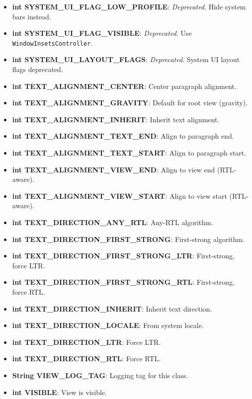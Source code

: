 \documentclass{report}
\begin{document}
\begin{itemize}
\begin{itemize}
                \item \textbf{int SYSTEM\_UI\_FLAG\_LOW\_PROFILE}: \textit{Deprecated}. Hide system bars instead.
                \item \textbf{int SYSTEM\_UI\_FLAG\_VISIBLE}: \textit{Deprecated}. Use \texttt{WindowInsetsController}.
                \item \textbf{int SYSTEM\_UI\_LAYOUT\_FLAGS}: \textit{Deprecated}. System UI layout flags deprecated.
                \item \textbf{int TEXT\_ALIGNMENT\_CENTER}: Center paragraph alignment.
                \item \textbf{int TEXT\_ALIGNMENT\_GRAVITY}: Default for root view (gravity).
                \item \textbf{int TEXT\_ALIGNMENT\_INHERIT}: Inherit text alignment.
                \item \textbf{int TEXT\_ALIGNMENT\_TEXT\_END}: Align to paragraph end.
                \item \textbf{int TEXT\_ALIGNMENT\_TEXT\_START}: Align to paragraph start.
                \item \textbf{int TEXT\_ALIGNMENT\_VIEW\_END}: Align to view end (RTL-aware).
                \item \textbf{int TEXT\_ALIGNMENT\_VIEW\_START}: Align to view start (RTL-aware).
                \item \textbf{int TEXT\_DIRECTION\_ANY\_RTL}: Any-RTL algorithm.
                \item \textbf{int TEXT\_DIRECTION\_FIRST\_STRONG}: First-strong algorithm.
                \item \textbf{int TEXT\_DIRECTION\_FIRST\_STRONG\_LTR}: First-strong, force LTR.
                \item \textbf{int TEXT\_DIRECTION\_FIRST\_STRONG\_RTL}: First-strong, force RTL.
                \item \textbf{int TEXT\_DIRECTION\_INHERIT}: Inherit text direction.
                \item \textbf{int TEXT\_DIRECTION\_LOCALE}: From system locale.
                \item \textbf{int TEXT\_DIRECTION\_LTR}: Force LTR.
                \item \textbf{int TEXT\_DIRECTION\_RTL}: Force RTL.
                \item \textbf{String VIEW\_LOG\_TAG}: Logging tag for this class.
                \item \textbf{int VISIBLE}: View is visible.
            \end{itemize}
    \end{itemize}
\end{document}
